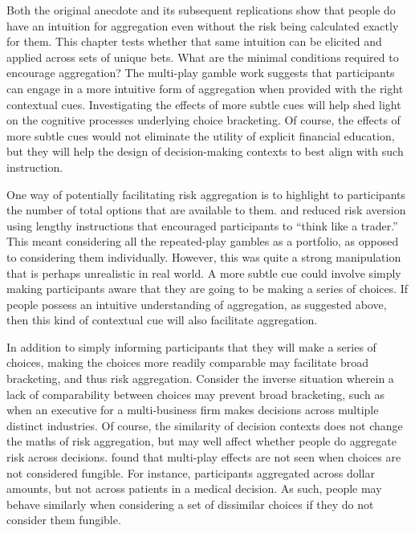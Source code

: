 \documentclass[a4paper, nobind, dvipsnames]{templates/ociamthesis}
\theoremstyle{definition}
\theoremstyle{definition}
\theoremstyle{definition}
\theoremstyle{definition}
\theoremstyle{remark}
\begin{document}
Both the original \textcite{samuelson1963} anecdote and its subsequent replications show
that people do have an intuition for aggregation even without the risk being
calculated exactly for them. This chapter tests whether that same intuition can
be elicited and applied across sets of unique bets. What are the minimal
conditions required to encourage aggregation? The multi-play gamble work
suggests that participants can engage in a more intuitive form of aggregation
when provided with the right contextual cues. Investigating the effects of more
subtle cues will help shed light on the cognitive processes underlying choice
bracketing. Of course, the effects of more subtle cues would not eliminate the
utility of explicit financial education, but they will help the design of
decision-making contexts to best align with such instruction.

One way of potentially facilitating risk aggregation is to highlight to
participants the number of total options that are available to them.
\textcite{sokolhessner2009} and \textcite{sokolhessner2012} reduced risk aversion using lengthy
instructions that encouraged participants to ``think like a trader.'' This meant
considering all the repeated-play gambles as a portfolio, as opposed to
considering them individually. However, this was quite a strong manipulation
that is perhaps unrealistic in real world. A more subtle cue could involve
simply making participants aware that they are going to be making a series of
choices. If people possess an intuitive understanding of aggregation, as
suggested above, then this kind of contextual cue will also facilitate
aggregation.

In addition to simply informing participants that they will make a series of
choices, making the choices more readily comparable may facilitate broad
bracketing, and thus risk aggregation. Consider the inverse situation wherein a
lack of comparability between choices may prevent broad bracketing, such as when
an executive for a multi-business firm makes decisions across multiple distinct
industries. Of course, the similarity of decision contexts does not change the
maths of risk aggregation, but may well affect whether people do aggregate risk
across decisions. \textcite{dekay2005} found that multi-play effects are not seen when
choices are not considered fungible. For instance, participants aggregated
across dollar amounts, but not across patients in a medical decision. As such,
people may behave similarly when considering a set of dissimilar choices if they
do not consider them fungible.
\end{document}
